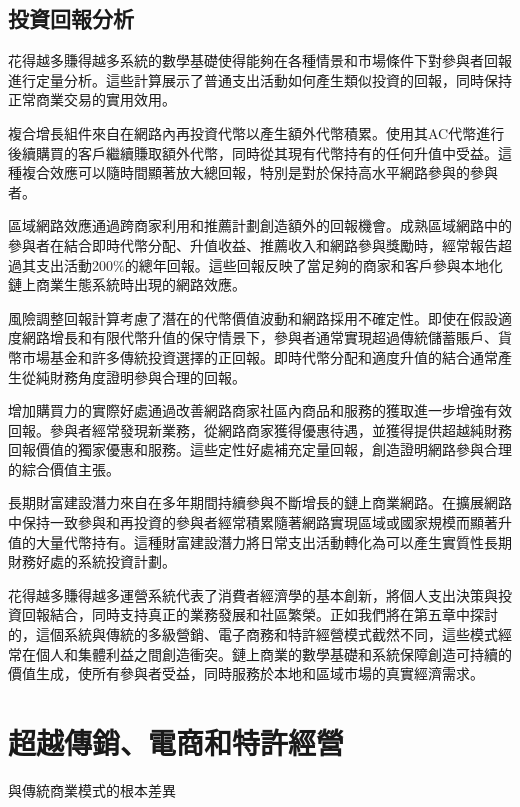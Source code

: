 \documentclass[
  Letterpaper,
]{scrbook}
\begin{document}
\section{投資回報分析}\label{ux6295ux8cc7ux56deux5831ux5206ux6790}

花得越多賺得越多系統的數學基礎使得能夠在各種情景和市場條件下對參與者回報進行定量分析。這些計算展示了普通支出活動如何產生類似投資的回報，同時保持正常商業交易的實用效用。

複合增長組件來自在網路內再投資代幣以產生額外代幣積累。使用其AC代幣進行後續購買的客戶繼續賺取額外代幣，同時從其現有代幣持有的任何升值中受益。這種複合效應可以隨時間顯著放大總回報，特別是對於保持高水平網路參與的參與者。

區域網路效應通過跨商家利用和推薦計劃創造額外的回報機會。成熟區域網路中的參與者在結合即時代幣分配、升值收益、推薦收入和網路參與獎勵時，經常報告超過其支出活動200\%的總年回報。這些回報反映了當足夠的商家和客戶參與本地化鏈上商業生態系統時出現的網路效應。

風險調整回報計算考慮了潛在的代幣價值波動和網路採用不確定性。即使在假設適度網路增長和有限代幣升值的保守情景下，參與者通常實現超過傳統儲蓄賬戶、貨幣市場基金和許多傳統投資選擇的正回報。即時代幣分配和適度升值的結合通常產生從純財務角度證明參與合理的回報。

增加購買力的實際好處通過改善網路商家社區內商品和服務的獲取進一步增強有效回報。參與者經常發現新業務，從網路商家獲得優惠待遇，並獲得提供超越純財務回報價值的獨家優惠和服務。這些定性好處補充定量回報，創造證明網路參與合理的綜合價值主張。

長期財富建設潛力來自在多年期間持續參與不斷增長的鏈上商業網路。在擴展網路中保持一致參與和再投資的參與者經常積累隨著網路實現區域或國家規模而顯著升值的大量代幣持有。這種財富建設潛力將日常支出活動轉化為可以產生實質性長期財務好處的系統投資計劃。

花得越多賺得越多運營系統代表了消費者經濟學的基本創新，將個人支出決策與投資回報結合，同時支持真正的業務發展和社區繁榮。正如我們將在第五章中探討的，這個系統與傳統的多級營銷、電子商務和特許經營模式截然不同，這些模式經常在個人和集體利益之間創造衝突。鏈上商業的數學基礎和系統保障創造可持續的價值生成，使所有參與者受益，同時服務於本地和區域市場的真實經濟需求。

\chapter{超越傳銷、電商和特許經營}\label{sec-beyond-traditional}

與傳統商業模式的根本差異
\end{document}
